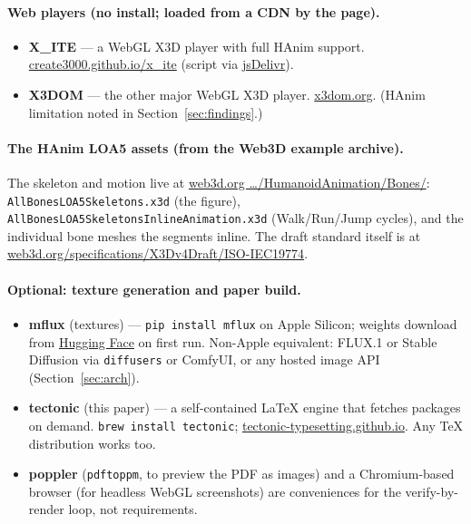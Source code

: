 \documentclass[11pt]{article}
\begin{document}
\paragraph{Web players (no install; loaded from a CDN by the page).}
\begin{itemize}[leftmargin=1.4em, itemsep=2pt]
\item \textbf{X\_ITE} --- a WebGL X3D player with full HAnim support.
  \href{https://create3000.github.io/x_ite/}{create3000.github.io/x\_ite} (script
  via \href{https://www.jsdelivr.com}{jsDelivr}).
\item \textbf{X3DOM} --- the other major WebGL X3D player.
  \href{https://www.x3dom.org}{x3dom.org}. (HAnim limitation noted in
  Section~\ref{sec:findings}.)
\end{itemize}

\paragraph{The HAnim LOA5 assets (from the Web3D example archive).}
The skeleton and motion live at
\href{https://www.web3d.org/x3d/content/examples/HumanoidAnimation/Bones/}{web3d.org \dots/HumanoidAnimation/Bones/}:
\texttt{AllBonesLOA5Skeletons.x3d} (the figure),
\texttt{AllBonesLOA5SkeletonsInlineAnimation.x3d} (Walk/Run/Jump cycles), and the
individual bone meshes the segments inline. The draft standard itself is at
\href{https://www.web3d.org/specifications/X3Dv4Draft/ISO-IEC19774/}{web3d.org/specifications/X3Dv4Draft/ISO-IEC19774}.

\paragraph{Optional: texture generation and paper build.}
\begin{itemize}[leftmargin=1.4em, itemsep=2pt]
\item \textbf{mflux} (textures) --- \texttt{pip install mflux} on Apple Silicon;
  weights download from \href{https://huggingface.co}{Hugging Face} on first run.
  Non-Apple equivalent: FLUX.1 or Stable Diffusion via \texttt{diffusers} or
  ComfyUI, or any hosted image API (Section~\ref{sec:arch}).
\item \textbf{tectonic} (this paper) --- a self-contained \LaTeX{} engine that
  fetches packages on demand. \texttt{brew install tectonic};
  \href{https://tectonic-typesetting.github.io}{tectonic-typesetting.github.io}.
  Any \TeX{} distribution works too.
\item \textbf{poppler} (\texttt{pdftoppm}, to preview the PDF as images) and a
  Chromium-based browser (for headless WebGL screenshots) are conveniences for
  the verify-by-render loop, not requirements.
\end{itemize}
\end{document}
